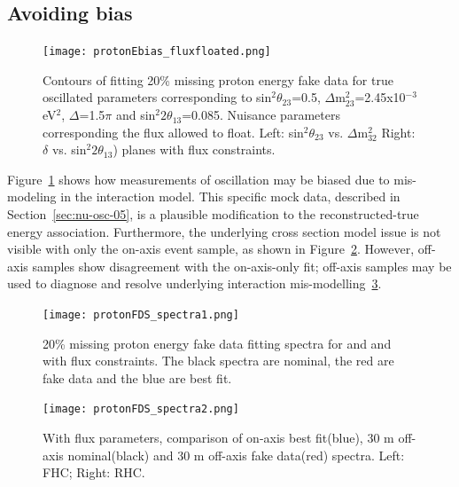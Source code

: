 
\subsection{Avoiding bias}

\begin{figure}[h]
\centering
\texttt{[image: protonEbias\_fluxfloated.png]}
\caption{Contours of fitting 20\% missing proton energy fake data for true oscillated parameters corresponding to  sin$^{2}\theta_{23}$=0.5, $\Delta$m$^{2}_{23}$=2.45x10$^{-3}$ eV$^{2}$, $\Delta$=1.5$\pi$ and sin$^{2}2\theta_{13}$=0.085. Nuisance parameters corresponding the flux allowed to float.
Left: sin$^{2}\theta_{23}$ vs. $\Delta$m$^{2}_{32}$ Right: $\delta$ vs. sin$^{2}2\theta_{13}$) planes with flux constraints.} \label{protonFDSbias}
\end{figure}

Figure~\ref{protonFDSbias} shows how measurements of oscillation may be biased due to mis-modeling in the interaction model. This specific mock data, described in Section~\ref{sec:nu-osc-05}, is a plausible modification to the reconstructed-true energy association. Furthermore, the underlying cross section model issue is not visible with only the on-axis event sample, as shown in Figure~\ref{fig:protonFDS_spectra1}. However, off-axis samples show disagreement with the on-axis-only  fit; off-axis samples may be used to diagnose and resolve underlying interaction mis-modelling~\ref{fig:protonFDS_spectra2}. %


\begin{figure}[h]
\centering
\texttt{[image: protonFDS\_spectra1.png]}
\caption{20\% missing proton energy fake data fitting spectra for  and   and  with flux constraints. The black spectra are nominal, the red are fake data and the blue are best fit.}
\label{fig:protonFDS_spectra1}
\end{figure}

\begin{figure}[h]
\centering
\texttt{[image: protonFDS\_spectra2.png]}
\caption{With flux parameters, comparison of on-axis best fit(blue), 30 m off-axis nominal(black) and 30 m off-axis fake data(red) spectra. Left: FHC; Right: RHC. }
\label{fig:protonFDS_spectra2}
\end{figure}
